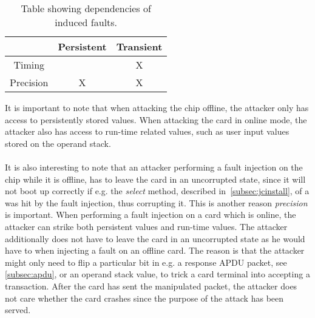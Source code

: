 \begin{table}[h!]
\centering
\begin{tabular}{|c|c|c|}
\hline  & Persistent & Transient \\ 
\hline Timing &  & X \\ 
\hline Precision & X & X \\ 
\hline 
\end{tabular} 
\caption{Table showing dependencies of induced faults.}
\label{tab:dependencies}
\end{table}

\noindent It is important to note that when attacking the chip offline, the attacker only has access to persistently stored values. When attacking the card in online mode, the attacker also has access to run-time related values, such as user input values stored on the operand stack.\\\\
It is also interesting to note that an attacker performing a fault injection on the chip while it is offline, has to leave the card in an uncorrupted state, since it will not boot up correctly if e.g. the \textit{select} method, described in~\cref{subsec:jcinstall}, of a \jc was hit by the fault injection, thus corrupting it. This is another reason \textit{precision} is important. When performing a fault injection on a card which is online, the attacker can strike both persistent values and run-time values. The attacker additionally does not have to leave the card in an uncorrupted state as he would have to when injecting a fault on an offline card. The reason is that the attacker might only need to flip a particular bit in e.g. a response APDU packet, see \cref{subsec:apdu}, or an operand stack value, to trick a card terminal into accepting a transaction. After the card has sent the manipulated packet, the attacker does not care whether the card crashes since the purpose of the attack has been served.\\\\

